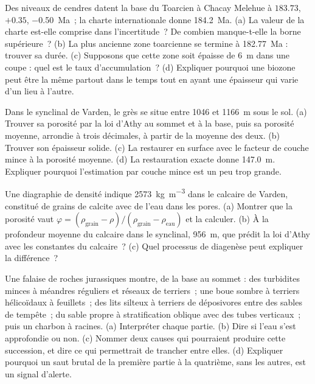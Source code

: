 \begin{exercise}[$\star\star$]\label{exo:b2:palaeoenvironments:6}
Des niveaux de cendres datent la base du Toarcien à Chacay Melehue à $183.73$, $+0.35$, \qty{-0.50}{Ma}~;
la charte internationale donne \qty{184.2}{Ma}. (a) La valeur de la charte est-elle comprise
dans l'incertitude~? De combien manque-t-elle la borne supérieure~? (b) La plus ancienne zone
toarcienne se termine à \qty{182.77}{Ma} : trouver sa durée. (c) Supposons que cette zone soit épaisse
de \qty{6}{m} dans une coupe : quel est le taux d'accumulation~? (d) Expliquer pourquoi une biozone
peut être la même partout dans le temps tout en ayant une épaisseur qui varie d'un lieu à l'autre.
\end{exercise}

\begin{exercise}[$\star\star$]\label{exo:b2:palaeoenvironments:7}
Dans le synclinal de Varden, le grès se situe entre 1046 et \qty{1166}{m} sous le sol. (a) Trouver
sa porosité par la loi d'Athy au sommet et à la base, puis sa porosité moyenne, arrondie à
trois décimales, à partir de la moyenne des deux. (b) Trouver son épaisseur solide. (c) La restaurer
en surface avec le facteur de couche mince à la porosité moyenne. (d) La restauration exacte
donne \qty{147.0}{m}. Expliquer pourquoi l'estimation par couche mince est un peu trop grande.
\end{exercise}

\begin{exercise}[$\star\star$]\label{exo:b2:palaeoenvironments:8}
Une diagraphie de densité indique \qty{2573}{kg.m^{-3}} dans le calcaire de Varden, constitué de grains de calcite avec
de l'eau dans les pores. (a) Montrer que la porosité vaut $\varphi = (\rho_{\text{grain}} -
\rho)/(\rho_{\text{grain}} - \rho_{\text{eau}})$ et la calculer. (b) À la profondeur moyenne du
calcaire dans le synclinal, \qty{956}{m}, que prédit la loi d'Athy avec les constantes du calcaire~?
(c) Quel processus de diagenèse peut expliquer la différence~?
\end{exercise}

\begin{exercise}[$\star\star$]\label{exo:b2:palaeoenvironments:9}
Une falaise de roches jurassiques montre, de la base au sommet : des turbidites minces à méandres
réguliers et réseaux de terriers~; une boue sombre à terriers hélicoïdaux à feuillets~; des
lits silteux à terriers de déposivores entre des sables de tempête~; du sable propre à
stratification oblique avec des tubes verticaux~; puis un charbon à racines. (a) Interpréter chaque
partie. (b) Dire si l'eau s'est approfondie ou non. (c) Nommer deux causes qui pourraient produire
cette succession, et dire ce qui permettrait de trancher entre elles. (d) Expliquer pourquoi
un saut brutal de la première partie à la quatrième, sans les autres, est un signal d'alerte.
\end{exercise}

